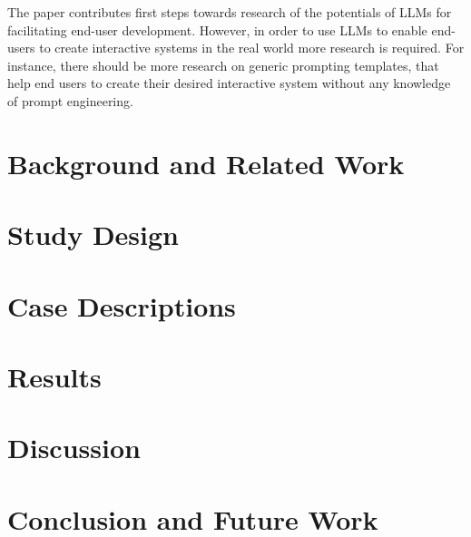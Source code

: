\documentclass[acsmall,screen]{acmart}
\begin{document}
The paper contributes first steps towards research of the potentials of LLMs for facilitating end-user development. However, in order to use LLMs to enable end-users to create interactive systems in the real world more research is required. For instance, there should be more research on generic prompting templates, that help end users to create their desired interactive system without any knowledge of prompt engineering.


\section{Background and Related Work}

\section{Study Design}

\section{Case Descriptions}

\section{Results}

\section{Discussion}

\section{Conclusion and Future Work}




\appendix
\end{document}
